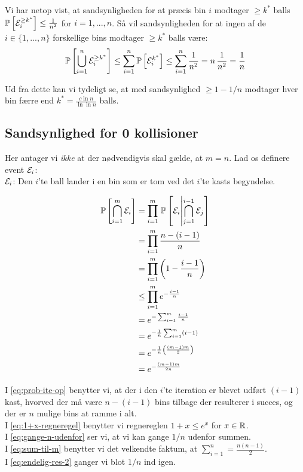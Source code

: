 Vi har netop vist, at sandsynligheden for at præcis bin $i$ modtager $\geq k^\ast$ balls $\mathbb{P} \left[   {\mathcal{E}}_i^{\geq k^\ast}   \right] \leq \frac{1}{n^2}$ for $i = 1, ..., n$.
Så vil sandsynligheden for at ingen af de $i \in \{1, ..., n\}$ forskellige bins modtager $\geq k^\ast$ balls være:
$$
\mathbb{P} \left[   \bigcup_{i=1}^n {\mathcal{E}}_i^{\geq k^\ast}   \right]
\leq \sum_{i=1}^n \mathbb{P} \left[   {\mathcal{E}}_i^{k^\ast}   \right]
\leq \sum_{i=1}^n \frac{1}{n^2}
= n \, \frac{1}{n^2}
= \frac{1}{n}
$$

Ud fra dette kan vi tydeligt se, at med sandsynlighed $\geq 1 - 1/n$ modtager hver bin færre end $k^\ast = \frac{c \ln n}{\ln \ln n}$ balls.

\newpage
\subsection{Sandsynlighed for 0 kollisioner}
Her antager vi \emph{ikke} at der nødvendigvis skal gælde, at $m = n$. Lad os definere event ${\mathcal{E}}_i$:\\
${\mathcal{E}}_i$: Den $i$'te ball lander i en bin som er tom ved det $i$'te kasts begyndelse.


\begin{align}
  \mathbb{P} \left[  \bigcap_{i=1}^m {\mathcal{E}}_i  \right]
  &= \prod_{i=1}^m \, \mathbb{P} \left[  {\mathcal{E}}_i \middle| \bigcap_{j=1}^{i-1} {\mathcal{E}}_j  \right] \nonumber \\
  &= \prod_{i=1}^m \frac{n - (i-1)}{n} \label{eq:prob-ite-op} \\
  &= \prod_{i=1}^m \left(  1 - \frac{i-1}{n}  \right) \nonumber \\
  &\leq \prod_{i=1}^m e^{- \frac{i-1}{n}} \label{eq:1+x-regneregel} \\
  &= e^{ - \sum_{i=1}^m \frac{i-1}{n}} \nonumber\\
  &= e^{- \frac{1}{n} \sum_{i=1}^m (i - 1) } \label{eq:gange-n-udenfor} \\
  &= e^{- \frac{1}{n} \left( \frac{(m-1)m}{2} \right) }  \label{eq:sum-til-m}  \\
  &= e^{- \frac{(m-1)m}{2n}}  \label{eq:endelig-res-2}
\end{align}

I \cref{eq:prob-ite-op} benytter vi, at der i den $i$'te iteration er blevet udført $(i-1)$ kast, hvorved der må være $n - (i-1)$ bins tilbage der resulterer i succes, og der er $n$ mulige bins at ramme i alt.\\
I \cref{eq:1+x-regneregel} benytter vi regnereglen $1 + x \leq e^x$ for $x \in {\mathbb R}$.\\
I \cref{eq:gange-n-udenfor} ser vi, at vi kan gange $1/n$ udenfor summen.\\
I \cref{eq:sum-til-m} benytter vi det velkendte faktum, at $\sum_{i=1}^n = \frac{n(n-1)}{2}$.\\
I \cref{eq:endelig-res-2} ganger vi blot $1/n$ ind igen.\\

